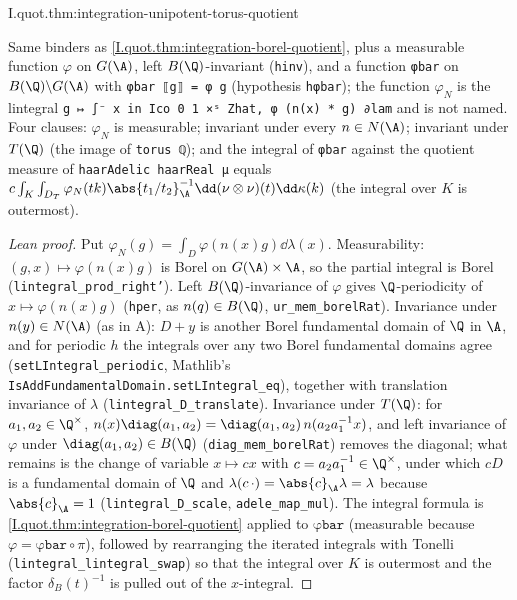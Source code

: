\begin{tfformal}{I.quot.thm:integration-unipotent-torus-quotient}
\begin{tffidelity}
Same binders as \cref{I.quot.thm:integration-borel-quotient}, plus a measurable function $\varphi$ on $G(\A)$, left $B(\Q)$-invariant (\texttt{hinv}), and a function \texttt{φbar} on $B(\Q)\backslash G(\A)$ with \texttt{φbar ⟦g⟧ = φ g} (hypothesis \texttt{hφbar}); the function $\varphi_N$ is the lintegral \texttt{g ↦ ∫⁻ x in Ico 0 1 ×ˢ Zhat, φ (n(x) * g) ∂lam} and is not named. Four clauses: $\varphi_N$ is measurable; invariant under every $n\in N(\A)$; invariant under $T(\Q)$ (the image of \texttt{torus ℚ}); and the integral of \texttt{φbar} against the quotient measure of \texttt{haarAdelic haarReal μ} equals $c\int_K\int_{D_T}\varphi_N(tk)\abs{t_1/t_2}_\A^{-1}\dd(\nu\otimes\nu)(t)\dd\kappa(k)$ (the integral over $K$ is outermost).
\end{tffidelity}
\end{tfformal}
\begin{proof}[Lean proof]
Put $\varphi_N(g)=\int_D\varphi(n(x)g)\dd\lambda(x)$. Measurability: $(g,x)\mapsto\varphi(n(x)g)$ is Borel on $G(\A)\times\A$, so the partial integral is Borel (\texttt{lintegral\_prod\_right'}). Left $B(\Q)$-invariance of $\varphi$ gives $\Q$-periodicity of $x\mapsto\varphi(n(x)g)$ (\texttt{hper}, as $n(q)\in B(\Q)$, \texttt{ur\_mem\_borelRat}). Invariance under $n(y)\in N(\A)$ (as in A): $D+y$ is another Borel fundamental domain of $\Q$ in $\A$, and for periodic $h$ the integrals over any two Borel fundamental domains agree (\texttt{setLIntegral\_periodic}, Mathlib's \texttt{IsAddFundamentalDomain.setLIntegral\_eq}), together with translation invariance of $\lambda$ (\texttt{lintegral\_D\_translate}). Invariance under $T(\Q)$: for $a_1,a_2\in\Q^\times$, $n(x)\diag(a_1,a_2)=\diag(a_1,a_2)\,n(a_2a_1^{-1}x)$, and left invariance of $\varphi$ under $\diag(a_1,a_2)\in B(\Q)$ (\texttt{diag\_mem\_borelRat}) removes the diagonal; what remains is the change of variable $x\mapsto cx$ with $c=a_2a_1^{-1}\in\Q^\times$, under which $cD$ is a fundamental domain of $\Q$ and $\lambda(c\,\cdot)=\abs{c}_\A\lambda=\lambda$ because $\abs{c}_\A=1$ (\texttt{lintegral\_D\_scale}, \texttt{adele\_map\_mul}). The integral formula is \cref{I.quot.thm:integration-borel-quotient} applied to $\texttt{φbar}$ (measurable because $\varphi=\texttt{φbar}\circ\pi$), followed by rearranging the iterated integrals with Tonelli (\texttt{lintegral\_lintegral\_swap}) so that the integral over $K$ is outermost and the factor $\delta_B(t)^{-1}$ is pulled out of the $x$-integral.
\end{proof}

